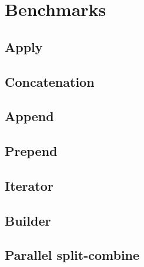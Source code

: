 \section{Benchmarks}


\subsection{Apply}



\subsection{Concatenation}



\subsection{Append}



\subsection{Prepend}



\subsection{Iterator}



\subsection{Builder}



\subsection{Parallel split-combine}





